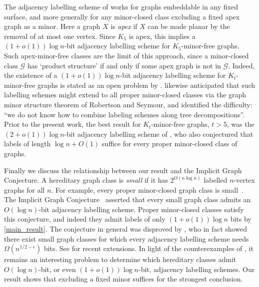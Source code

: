 \documentclass{patmorin}
\newcommand{\defin}[1]{\emph{\textcolor{brightmaroon}{#1}}}
\newcommand{\Oh}{O}
\newcommand{\calG}{\mathcal{G}}
\begin{document}
The adjacency labelling scheme of \citet{dujmovic.esperet.ea:adjacency} works for  graphs embeddable in any fixed surface, and more generally for any minor-closed class excluding a fixed apex graph as a minor. Here a graph $X$ is \defin{apex} if $X$ can be made planar by the removal of at most one vertex. Since $K_5$ is apex, this implies a $(1+o(1))\log n$-bit adjacency labelling scheme for $K_5$-minor-free graphs. Such apex-minor-free classes are the limit of this approach, since a minor-closed class $\calG$ has `product structure' if and only if some apex graph is not in $\calG$. Indeed, the existence of a $(1+o(1))\log n$-bit adjacency labelling scheme for $K_t$-minor-free graphs is stated as an open problem by \citet[Section~6, Problem~2]{dujmovic.esperet.ea:adjacency}. \citet{BGP22} likewise anticipated that such labelling schemes might extend to all proper minor-closed classes via the graph minor structure theorem of Robertson and Seymour, and identified the difficulty: ``we do not know how to combine labeling schemes along tree decompositions''.
 Prior to the present work, the best result for $K_t$-minor-free graphs, $t > 5$, was the $(2+o(1))\log n$-bit adjacency labelling scheme of \citet{gavoille.labourel:shorter}, who also conjectured that labels of length $\log n + \Oh(1)$ suffice for
every proper minor-closed class of graphs.



Finally we discuss the relationship between our result and the Implicit Graph Conjecture. A hereditary graph class is \defin{small} if it has $2^{O(n\log n)}$ labelled $n$-vertex graphs for all $n$. For example, every proper minor-closed graph class is small~\citep{NSTW06}. The Implicit Graph Conjecture~\citep{kannan.naor.ea:implicit} asserted that every small graph class admits an $O(\log n)$-bit adjacency labelling scheme. Proper minor-closed classes satisfy this conjecture, and indeed they admit labels of only $(1+o(1))\log n$ bits by \cref{main_result}. The conjecture in general was disproved by \citet{HH22}, who in fact showed there exist small graph classes for which every adjacency labelling scheme needs $\Omega(n^{1/2-\epsilon})$ bits. See \citep{Bonnet-etal-ICALP24,Bonnet-etal-SJC24,Alon24} for recent extensions. In light of the counterexamples of \cite{HH22}, it remains an interesting problem to determine which hereditary classes admit $O(\log n)$-bit, or even $(1+o(1))\log n$-bit, adjacency labelling schemes. Our result shows that excluding a fixed minor suffices for the strongest conclusion.
\end{document}
